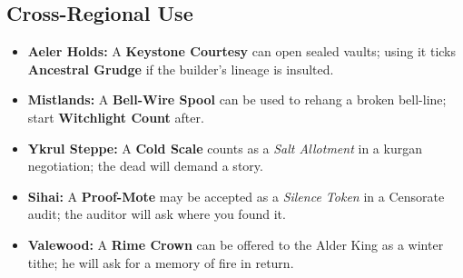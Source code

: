 \subsection*{Cross-Regional Use}
\begin{itemize}
    \item \textbf{Aeler Holds:} A \textbf{Keystone Courtesy} can open sealed vaults; using it ticks \textbf{Ancestral Grudge} if the builder's lineage is insulted.
    \item \textbf{Mistlands:} A \textbf{Bell-Wire Spool} can be used to rehang a broken bell-line; start \textbf{Witchlight Count} after.
    \item \textbf{Ykrul Steppe:} A \textbf{Cold Scale} counts as a \emph{Salt Allotment} in a kurgan negotiation; the dead will demand a story.
    \item \textbf{Sihai:} A \textbf{Proof-Mote} may be accepted as a \emph{Silence Token} in a Censorate audit; the auditor will ask where you found it.
    \item \textbf{Valewood:} A \textbf{Rime Crown} can be offered to the Alder King as a winter tithe; he will ask for a memory of fire in return.
\end{itemize}

